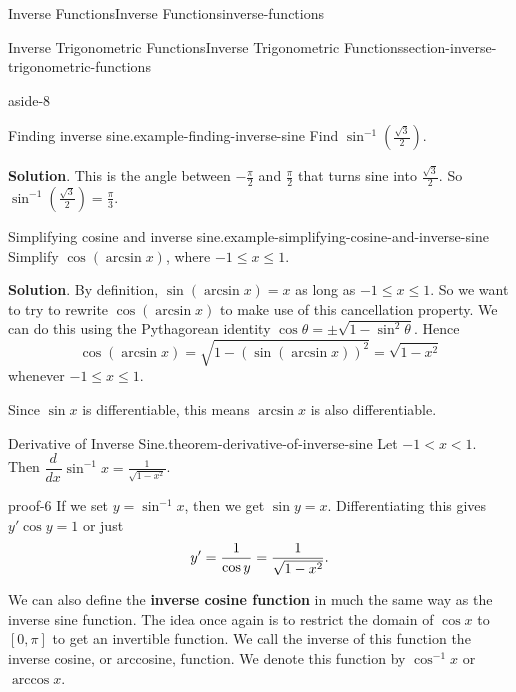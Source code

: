 \documentclass[oneside,10pt,]{book}
\newcommand{\terminology}[1]{\textbf{#1}}
\renewcommand{\qedhere}{\relax}
\numberwithin{equation}{section}
\newcommand{\dv}[3][]{\dfrac{d^{#1} #2}{d #3^{#1}}}
\begin{document}
\begin{chapterptx}{Inverse Functions}{}{Inverse Functions}{}{}{inverse-functions}
\begin{sectionptx}{Inverse Trigonometric Functions}{}{Inverse Trigonometric Functions}{}{}{section-inverse-trigonometric-functions}
\begin{aside}{}{aside-8}
\end{aside}
%
\begin{example}{Finding inverse sine.}{example-finding-inverse-sine}%
\hypertarget{p-261}{}%
Find \(\sin^{-1}(\frac{\sqrt{3}}{2})\).%
\par\smallskip%
\noindent\textbf{Solution}.\hypertarget{solution-56}{}\quad%
\hypertarget{p-262}{}%
This is the angle between \(-\frac{\pi}{2}\) and \(\frac{\pi}{2}\) that turns sine into \(\frac{\sqrt{3}}{2}\). So \(\sin^{-1}(\frac{\sqrt{3}}{2}) = \frac{\pi}{3}\).%
\end{example}
\begin{example}{Simplifying cosine and inverse sine.}{example-simplifying-cosine-and-inverse-sine}%
\hypertarget{p-263}{}%
Simplify \(\cos(\arcsin x)\), where \(-1\leq x\leq 1\).%
\par\smallskip%
\noindent\textbf{Solution}.\hypertarget{solution-57}{}\quad%
\hypertarget{p-264}{}%
By definition, \(\sin(\arcsin x) = x\) as long as \(-1\leq x\leq 1\). So we want to try to rewrite \(\cos(\arcsin x)\) to make use of this cancellation property. We can do this using the Pythagorean identity \(\cos \theta = \pm\sqrt{1-\sin^{2}\theta}\). Hence%
\begin{equation*}
\cos(\arcsin x) = \sqrt{1-(\sin(\arcsin x))^{2}} = \sqrt{1 - x^{2}}
\end{equation*}
whenever \(-1\leq x\leq 1\).%
\end{example}
\hypertarget{p-265}{}%
Since \(\sin x\) is differentiable, this means \(\arcsin x\) is also differentiable.%
\begin{theorem}{Derivative of Inverse Sine.}{}{theorem-derivative-of-inverse-sine}%
\hypertarget{p-266}{}%
Let \(-1 < x < 1\). Then \(\dv{}{x}\sin^{-1}x = \frac{1}{\sqrt{1-x^{2}}}\).%
\end{theorem}
\begin{proofptx}{}{proof-6}
\hypertarget{p-267}{}%
If we set \(y = \sin^{-1}x\), then we get \(\sin y = x\). Differentiating this gives \(y'\cos y = 1\) or just%
\begin{equation*}
y' = \frac{1}{\cos y} = \frac{1}{\sqrt{1-x^{2}}}.\qedhere
\end{equation*}
%
\end{proofptx}
\hypertarget{p-268}{}%
We can also define the \terminology{inverse cosine function} in much the same way as the inverse sine function. The idea once again is to restrict the domain of \(\cos x\) to \([0,\pi]\) to get an invertible function. We call the inverse of this function the inverse cosine, or arccosine, function. We denote this function by \(\cos^{-1}x\) or \(\arccos x\).%

\end{sectionptx}
\end{chapterptx}
\end{document}
